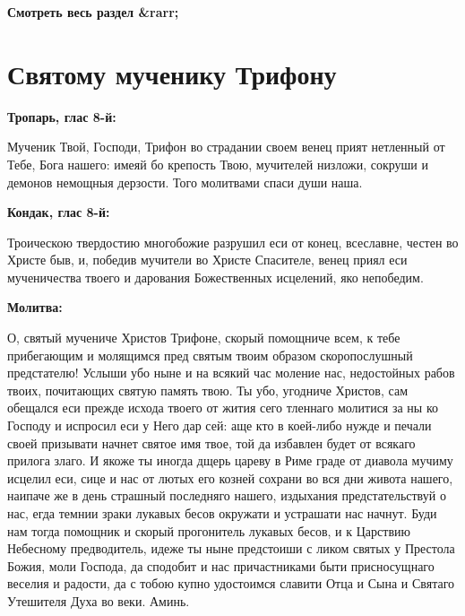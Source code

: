 \mychapterending


\bfseries Смотреть весь раздел &rarr;\normalfont{} 

\section{Святому мученику Трифону}
 

\bfseries Тропарь, глас 8-й:\normalfont{}


Мученик Твой, Господи, Трифон во страдании своем венец прият нетленный от Тебе, Бога нашего: имеяй бо крепость Твою, мучителей низложи, сокруши и демонов немощныя дерзости. Того молитвами спаси души наша.


\medskip


\bfseries Кондак, глас 8-й:\normalfont{}


Троическою твердостию многобожие разрушил еси от конец, всеславне, честен во Христе быв, и, победив мучители во Христе Спасителе, венец приял еси мученичества твоего и дарования Божественных исцелений, яко непобедим.


\medskip


\bfseries Молитва:\normalfont{}


О, святый мучениче Христов Трифоне, скорый помощниче всем, к тебе прибегающим и молящимся пред святым твоим образом скоропослушный предстателю! Услыши убо ныне и на всякий час моление нас, недостойных рабов твоих, почитающих святую память твою. Ты убо, угодниче Христов, сам обещался еси прежде исхода твоего от жития сего тленнаго молитися за ны ко Господу и испросил еси у Него дар сей: аще кто в коей-либо нужде и печали своей призывати начнет святое имя твое, той да избавлен будет от всякаго прилога злаго. И якоже ты иногда дщерь цареву в Риме граде от диавола мучиму исцелил еси, сице и нас от лютых его козней сохрани во вся дни живота нашего, наипаче же в день страшный последняго нашего, издыхания предстательствуй о нас, егда темнии зраки лукавых бесов окружати и устрашати нас начнут. Буди нам тогда помощник и скорый прогонитель лукавых бесов, и к Царствию Небесному предводитель, идеже ты ныне предстоиши с ликом святых у Престола Божия, моли Господа, да сподобит и нас причастниками быти присносущнаго веселия и радости, да с тобою купно удостоимся славити Отца и Сына и Святаго Утешителя Духа во веки. Аминь.


